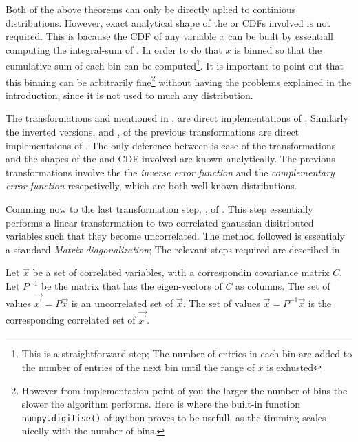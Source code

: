 Both of the above theorems can only be directly aplied to continious distributions.
However, exact analytical shape of the \pdfs or CDFs involved is not required. This is bacause the CDF
of any variable $x$ can be built by essentiall computing the integral-sum of . In order
to do that $x$ is binned so that the cumulative sum of each bin can be computed\footnote{This is a straightforward
step; The number of entries in each bin are added to the number of entries of the next bin until the range of $x$
is exhusted}. It is important to point out that this binning can be arbitrarily fine\footnote{However from
implementation point of you the larger the number of bins the slower the algorithm performs. Here is where
the built-in function {\tt numpy.digitise()} of {\tt python} proves to be usefull, as the timming scales
nicelly with the number of bins.} without having the problems explained in the introduction, since it is not
used to much any distribution.

The transformations \gFlat{} and \gGaus{} mentioned in , are direct implementations of
. Similarly the inverted versions, \gFlatInv{} and \gGausInv{},
of the previous transformations are direct implementaions of .
The only deference between is case of the transformations \gGaus{} and \gGausInv{} the shapes
of the \pdf and CDF involved are known analytically. The previous transformations involve the
the {\it inverse error function} and the {\it complementary error function} resepctivelly, which
are both well known distributions.

Comming now to the last transformation step, \gGausUn{}, of .
This step essentially performs a linear transformation to two correlated gaaussian disitributed
variables such that they become uncorrelated. The method followed is essentialy a standard
{\it Matrix diagonalization}; The relevant steps required are described in 

\begin{method}
 Let $\vec{x}$ be a set of correlated variables, with a correspondin covariance matrix $C$.
 Let $P^{-1}$ be the matrix that has the eigen-vectors of $C$ as columns.
 The set of values $\vec{x^\prime} = P\vec{x}$ is an uncorrelated set of $\vec{x}$.
 The set of values $\vec{x} = P^{-1}\vec{x}$ is the corresponding correlated set of $\vec{x^{\prime}}$.
 \label{meth_matrix_diag}
\end{method}

